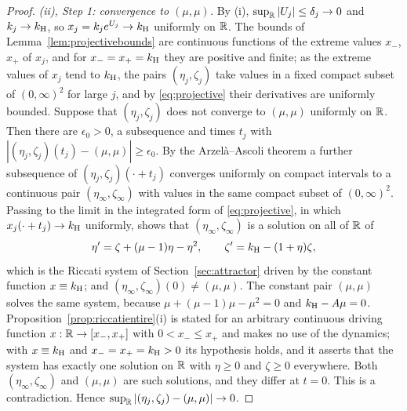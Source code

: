\begin{proof}
\emph{(ii), Step 1: convergence to $(\mu,\mu)$.} By (i), $\sup_\mathbb R|U_j|\le\delta_j\to0$ and $k_j\to k_{\mathrm H}$, so $x_j=k_je^{U_j}\to k_{\mathrm H}$ uniformly on $\mathbb R$. The bounds of Lemma~\ref{lem:projectivebounds} are continuous functions of the extreme values $x_-$, $x_+$ of $x_j$, and for $x_-=x_+=k_{\mathrm H}$ they are positive and finite; as the extreme values of $x_j$ tend to $k_{\mathrm H}$, the pairs $(\eta_j,\zeta_j)$ take values in a fixed compact subset of $(0,\infty)^2$ for large $j$, and by \eqref{eq:projective} their derivatives are uniformly bounded. Suppose that $(\eta_j,\zeta_j)$ does not converge to $(\mu,\mu)$ uniformly on $\mathbb R$. Then there are $\epsilon_0>0$, a subsequence and times $t_j$ with $|(\eta_j,\zeta_j)(t_j)-(\mu,\mu)|\ge\epsilon_0$. By the Arzel\`a--Ascoli theorem a further subsequence of $(\eta_j,\zeta_j)(\cdot+t_j)$ converges uniformly on compact intervals to a continuous pair $(\eta_\infty,\zeta_\infty)$ with values in the same compact subset of $(0,\infty)^2$. Passing to the limit in the integrated form of \eqref{eq:projective}, in which $x_j(\cdot+t_j)\to k_{\mathrm H}$ uniformly, shows that $(\eta_\infty,\zeta_\infty)$ is a solution on all of $\mathbb R$ of
\[
\eta'=\zeta+(\mu-1)\eta-\eta^2,\qquad \zeta'=k_{\mathrm H}-(1+\eta)\zeta ,
\]
which is the Riccati system of Section~\ref{sec:attractor} driven by the constant function $x\equiv k_{\mathrm H}$; and $(\eta_\infty,\zeta_\infty)(0)\ne(\mu,\mu)$. The constant pair $(\mu,\mu)$ solves the same system, because $\mu+(\mu-1)\mu-\mu^2=0$ and $k_{\mathrm H}-A\mu=0$. Proposition~\ref{prop:riccatientire}(i) is stated for an arbitrary continuous driving function $x:\mathbb R\to[x_-,x_+]$ with $0<x_-\le x_+$ and makes no use of the dynamics; with $x\equiv k_{\mathrm H}$ and $x_-=x_+=k_{\mathrm H}>0$ its hypothesis holds, and it asserts that the system has exactly one solution on $\mathbb R$ with $\eta\ge0$ and $\zeta\ge0$ everywhere. Both $(\eta_\infty,\zeta_\infty)$ and $(\mu,\mu)$ are such solutions, and they differ at $t=0$. This is a contradiction. Hence $\sup_\mathbb R|(\eta_j,\zeta_j)-(\mu,\mu)|\to0$.


\end{proof}
